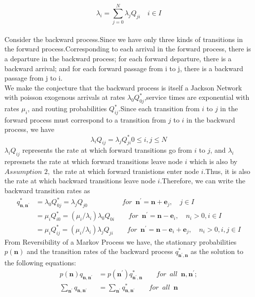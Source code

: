 \documentclass[a4paper,12pt]{scrartcl}
\begin{document}
\begin{equation}
\lambda_i = \sum_{j=0}^{N} \lambda_j Q_{ji} \quad i \in I
\end{equation}\\
Consider the backward process.Since we have only three kinds of transitions in the forward process.Corresponding to each arrival in the forward process, there is a departure in the backward process; for each forward departure, there is a backward arrival; and for each forward passage from i to j, there is a backward passage from j to i.\\
We make the conjecture that the backward process is itself a Jackson Network with poisson exogenous arrivals at rates $\lambda_0 Q_{0j}^{*}$,service times are exponential with rates   $\mu_i$, and routing probabilities $Q_{ij}^*$.Since each transition from $i$ to $j$ in the forward process must correspond to a transition from $j$ to $i$ in the backward process, we have
\begin{equation}
\lambda_i Q_{ij} = \lambda_j Q_{ji}^* 0 \leq i,j \leq N
\end{equation}
$\lambda_i Q_{ij}$ represents the rate at which forward transitions go from $i$ to $j$, and $\lambda_i$ represnets the rate at which forward transitions leave node $i$ which is also by $\textit{Assumption 2},$ the rate at which forward tranistions enter node $i$.Thus, it is also the rate at which backward transitions leave node $i$.Therefore, we can write the backward transition rates as
\begin{align}
q_{\textbf{n},\textbf{n}^{\prime}}^*&=\lambda_0Q_{0j}^*=\lambda_jQ_{j0}\quad\quad\quad\quad\quad for\enspace\textbf{n}^{\prime} = \textbf{n} + \textbf{e}_j,\quad j\in I\\
&=\mu_iQ_{i0}^*=(\mu_i/\lambda_i)\lambda_0Q_{0i} \quad\quad for\enspace\textbf{n}^{\prime} = \textbf{n} - \textbf{e}_i,\quad n_i > 0, i \in I\\
&=\mu_iQ_{ij}^*=(\mu_i/\lambda_i)\lambda_jQ_{ji} \quad\quad for\enspace\textbf{n}^{\prime} = \textbf{n} - \textbf{e}_i + \textbf{e}_j,\quad n_i > 0, i,j \in I
\end{align}
From Reversibility of a Markov Process we have, the stationary probabilities $p(\textbf{n})$ and the transition rates of  the backward process $q_{\textbf{n}^{\prime},\textbf{n}}^*$ as the solution to the following equations:
\begin{align*}
p(\textbf{n})q_{\textbf{n},\textbf{n}^{\prime}}&=p(\textbf{n}^{\prime})q_{\textbf{n}^{\prime},\textbf{n}}^*\qquad for\enspace all \enspace \textbf{n},\textbf{n}^{\prime};\\
\sum_{\textbf{n}^{\prime}}q_{\textbf{n},\textbf{n}^{\prime}}&=\sum_{\textbf{n}^{\prime}}q_{\textbf{n},\textbf{n}^{\prime}}^*\qquad for\enspace all \enspace \textbf{n}
\end{align*}
\end{document}
